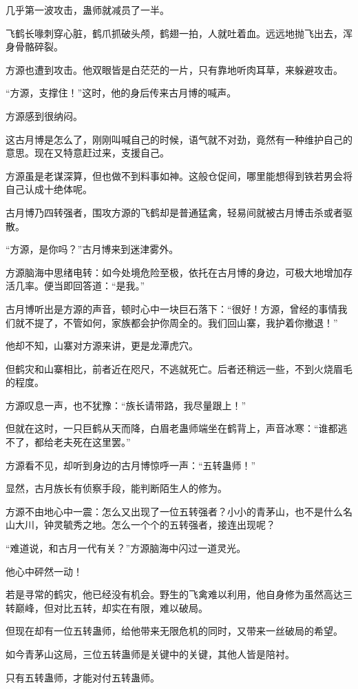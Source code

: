 \begin{this_body}
几乎第一波攻击，蛊师就减员了一半。

飞鹤长喙刺穿心脏，鹤爪抓破头颅，鹤翅一拍，人就吐着血。远远地抛飞出去，浑身骨骼碎裂。

方源也遭到攻击。他双眼皆是白茫茫的一片，只有靠地听肉耳草，来躲避攻击。

“方源，支撑住！”这时，他的身后传来古月博的喊声。

方源感到很纳闷。

这古月博是怎么了，刚刚叫喊自己的时候，语气就不对劲，竟然有一种维护自己的意思。现在又特意赶过来，支援自己。

方源虽是老谋深算，但也做不到料事如神。这般仓促间，哪里能想得到铁若男会将自己认成十绝体呢。

古月博乃四转强者，围攻方源的飞鹤却是普通猛禽，轻易间就被古月博击杀或者驱散。

“方源，是你吗？”古月博来到迷津雾外。

方源脑海中思绪电转：如今处境危险至极，依托在古月博的身边，可极大地增加存活几率。便当即回答道：“是我。”

古月博听出是方源的声音，顿时心中一块巨石落下：“很好！方源，曾经的事情我们就不提了，不管如何，家族都会护你周全的。我们回山寨，我护着你撤退！”

他却不知，山寨对方源来讲，更是龙潭虎穴。

但鹤灾和山寨相比，前者近在咫尺，不逃就死亡。后者还稍远一些，不到火烧眉毛的程度。

方源叹息一声，也不犹豫：“族长请带路，我尽量跟上！”

但就在这时，一只巨鹤从天而降，白眉老蛊师端坐在鹤背上，声音冰寒：“谁都逃不了，都给老夫死在这里罢。”

方源看不见，却听到身边的古月博惊呼一声：“五转蛊师！”

显然，古月族长有侦察手段，能判断陌生人的修为。

方源不由地心中一震：怎么又出现了一位五转强者？小小的青茅山，也不是什么名山大川，钟灵毓秀之地。怎么一个个的五转强者，接连出现呢？

“难道说，和古月一代有关？”方源脑海中闪过一道灵光。

他心中砰然一动！

若是寻常的鹤灾，他已经没有机会。野生的飞禽难以利用，他自身修为虽然高达三转巅峰，但对比五转，却实在有限，难以破局。

但现在却有一位五转蛊师，给他带来无限危机的同时，又带来一丝破局的希望。

如今青茅山这局，三位五转蛊师是关键中的关键，其他人皆是陪衬。

只有五转蛊师，才能对付五转蛊师。


\end{this_body}
